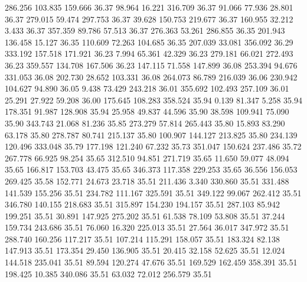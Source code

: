  286.256  103.835  159.666        36.37
  98.964   16.221  316.709        36.37
  91.066   77.936   28.801        36.37
 279.015   59.474  297.753        36.37
  39.628  150.753  219.677        36.37
 160.955   32.212    3.433        36.37
 357.359   89.786   57.513        36.37
 276.363   53.261  286.855        36.35
 201.943  136.458   15.127        36.35
 110.609   72.263  104.685        36.35
 207.039   33.081  356.092        36.29
 333.192  157.518  171.921        36.23
   7.994   65.361   42.329        36.23
 279.181   66.021  272.493        36.23
 359.557  134.708  167.506        36.23
 147.115   71.558  147.899        36.08
 253.394   94.676  331.053        36.08
 202.730   28.652  103.331        36.08
 264.073   86.789  216.039        36.06
 230.942  104.627   94.890        36.05
   9.438   73.429  243.218        36.01
 355.692  102.493  257.109        36.01
  25.291   27.922   59.208        36.00
 175.645  108.283  358.524        35.94
   0.139   81.347    5.258        35.94
 178.351   91.987  128.908        35.94
  25.958   49.837   44.596        35.90
  38.598  109.941   75.090        35.90
 343.743   21.068   81.236        35.85
 273.279   57.814  265.443        35.80
  15.893   83.290   63.178        35.80
 278.787   80.741  215.137        35.80
 100.907  144.127  213.825        35.80
 234.139  120.496  333.048        35.79
 177.198  121.240   67.232        35.73
 351.047  150.624  237.486        35.72
 267.778   66.925   98.254        35.65
 312.510   94.851  271.719        35.65
  11.650   59.077   48.094        35.65
 166.817  153.703   43.475        35.65
 346.373  117.358  229.253        35.65
  36.556  156.053  269.425        35.58
 152.771   24.673   23.718        35.51
 211.436    3.340  330.860        35.51
 331.488  141.539  155.256        35.51
 234.782  111.167  325.591        35.51
 349.122   99.067  262.412        35.51
 346.780  140.155  218.683        35.51
 315.897  154.230  194.157        35.51
 287.103   85.942  199.251        35.51
  30.891  147.925  275.202        35.51
  61.538   78.109   53.808        35.51
  37.244  159.734  243.686        35.51
  76.060   16.320  225.013        35.51
  27.564   36.017  347.972        35.51
 288.740  160.256  117.217        35.51
 107.214  115.291  158.057        35.51
 183.324   82.138  147.913        35.51
 173.354   29.450  136.905        35.51
  20.415   32.158   52.625        35.51
  12.024  144.518  235.041        35.51
  89.594  120.274   47.676        35.51
 169.529  162.459  358.391        35.51
 198.425   10.385  340.086        35.51
  63.032   72.012  256.579        35.51
